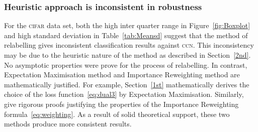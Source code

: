 \documentclass[12pt]{article} %
\begin{document}
\subsubsection{Heuristic approach is inconsistent in robustness}
For the \textsc{cifar} data set, both the high inter quarter range in Figure~\ref{fig:Boxplot} and high standard deviation in Table~\ref{tab:Meansd} suggest that the method of relabelling gives inconsistent classification results against \textsc{ccn}. This inconsistency may be due to the heuristic nature of the method as described in  Section~\ref{2nd}. No asymptotic properties were prove for the process of relabelling. In contrast, Expectation Maximisation method and Importance Reweighting method are mathematically justified. For example, Section~\ref{1st} mathematically derives the choice of the loss function~\eqref{eq:dual3} by Expectation Maximisation.
Similarly, \citet{liu2016classification} give rigorous proofs justifying the properties of the Importance Reweighting formula~\eqref{eq:weighting}. As a result of solid theoretical support, these two methods produce more consistent results.
\end{document}
